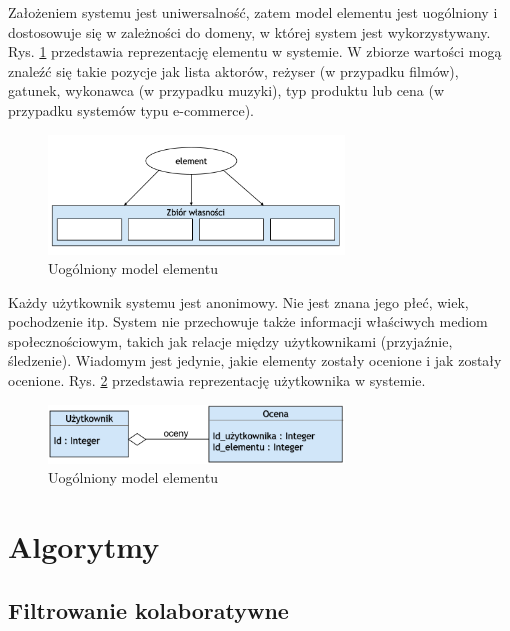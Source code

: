 \documentclass[twoside]{iisthesis}
\begin{document}
 Założeniem systemu jest uniwersalność, zatem model elementu jest uogólniony i dostosowuje się w zależności do domeny, w której system jest wykorzystywany. Rys. \ref{fig:modelElementu} przedstawia reprezentację elementu w systemie. W zbiorze wartości mogą znaleźć się takie pozycje jak lista aktorów, reżyser (w przypadku filmów), gatunek, wykonawca (w przypadku muzyki), typ produktu lub cena (w przypadku systemów typu e-commerce).
 
 \begin{figure}[!ht] 
 	\centering
 	\includegraphics[width=0.7\textwidth]{modelElementu}
 	\caption{Uogólniony model elementu}
 	\label{fig:modelElementu}
 \end{figure}
 
 Każdy użytkownik systemu jest anonimowy. Nie jest znana jego płeć, wiek, pochodzenie itp. System nie przechowuje także informacji właściwych mediom społecznościowym, takich jak relacje między użytkownikami (przyjaźnie, śledzenie). Wiadomym jest jedynie, jakie elementy zostały ocenione i jak zostały ocenione. Rys. \ref{fig:modelUsera} przedstawia reprezentację użytkownika w systemie.
 
 \begin{figure}[!ht] 
  	\centering
  	\includegraphics[width=0.7\textwidth]{modelUsera}
  	\caption{Uogólniony model elementu}
  	\label{fig:modelUsera}
  \end{figure}


 \chapter{Algorytmy}


	 \section{Filtrowanie kolaboratywne}
	 
\end{document}
